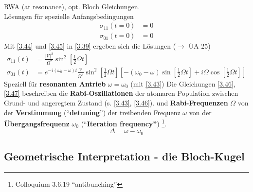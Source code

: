 
\noindent
RWA (at resonance), opt. Bloch Gleichungen.\\[5pt]
Lösungen für spezielle Anfangsbedingungen
\begin{equation}
\begin{aligned}
\sigma_{11}(t = 0) &= 0 \\
\sigma_{01}(t = 0) &= 0
\end{aligned}
\label{3.45}
\end{equation}
Mit \eqref{3.44} und \eqref{3.45} in \eqref{3.39} ergeben sich die Lösungen ($ \to $ ÜA 25)
\begin{equation}
\begin{aligned}
\sigma_{11}(t) &= \frac{|\mathcal{V}|^2}{\Omega^2} \sin^2 \left[\frac{1}{2} \Omega t\right] \\
\sigma_{01}(t) &= e^{-i(\omega_0 - \omega )t} \frac{\mathcal{V}}{\Omega^2} \sin^2 \left[\frac{1}{2} \Omega t\right] \left[- (\omega_0 - \omega) \sin\left[\frac{1}{2} \Omega t\right] + i \Omega \cos \left[\frac{1}{2} \Omega t\right]\right]
\end{aligned}
\label{3.46}
\end{equation}
Speziell für \textbf{resonanten Antrieb} $ \omega = \omega_0 $ (mit \eqref{3.43})
Die Gleichungen \eqref{3.46}, \eqref{3.47} beschreiben die \textbf{Rabi-Oszillationen} der atomaren Population zwischen Grund- und angeregtem Zustand (s. \cref{3.43}, \eqref{3.46}). und \textbf{Rabi-Frequenzen} $ \Omega $ von der \textbf{Verstimmung} (``\textbf{detuning}'') der treibenden Frequenz $ \omega $ von der \textbf{Übergangsfrequenz} $ \omega_0 $ (``\textbf{Iteration frequency''}) \footnote{Colloquium 3.6.19 ``antibunching''}.
\begin{equation}
\Delta = \omega - \omega_0
\end{equation}

\subsection{Geometrische Interpretation - die Bloch-Kugel}

